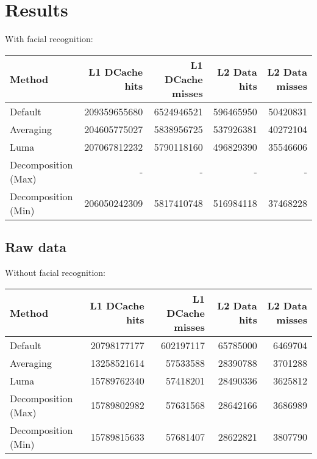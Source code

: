 \documentclass[a4paper]{article}
\begin{document}
\section{Results}
With facial recognition:
\begin{center}
\begin{tabular}{ |l||r|r|r|r| }
\hline
Method & L1 DCache hits & L1 DCache misses & L2 Data hits & L2 Data misses  \\
\hline\hline
Default & 209359655680 & 6524946521 & 596465950 & 50420831 \\
\hline
Averaging & 204605775027 & 5838956725 & 537926381 & 40272104 \\
\hline
Luma & 207067812232 & 5790118160 & 496829390 & 35546606 \\
\hline
Decomposition (Max)\footnotemark & - & - & - & - \\
\hline
Decomposition (Min) & 206050242309 & 5817410748 & 516984118 & 37468228 \\
\hline
\end{tabular}
\end{center}

\subsection{Raw data}
Without facial recognition:
\begin{center}
\begin{tabular}{ |l||r|r|r|r| }
\hline
Method & L1 DCache hits & L1 DCache misses & L2 Data hits & L2 Data misses  \\
\hline\hline
Default & 20798177177 & 602197117 & 65785000 &  6469704 \\
\hline
Averaging & 13258521614 & 57533588 & 28390788 & 3701288 \\
\hline
Luma & 15789762340 & 57418201 & 28490336 &  3625812\\
\hline
Decomposition (Max) & 15789802982 & 57631568 & 28642166 & 3686989 \\
\hline
Decomposition (Min) & 15789815633 & 57681407 & 28622821 & 3807790 \\
\hline
\end{tabular}
\end{center}

\end{document}
